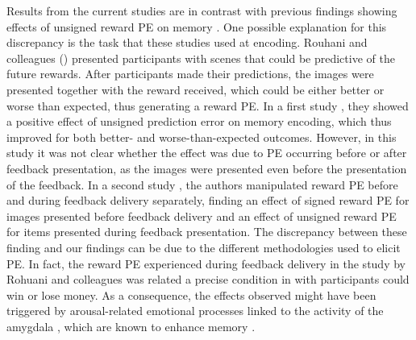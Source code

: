 \documentclass[a4paper,12pt]{article}
\begin{document}
Results from the current studies are in contrast with previous findings showing effects of unsigned reward PE on memory \citep{Rouhani2018, Rouhani2021}. One possible explanation for this discrepancy is the task that these studies used at encoding. Rouhani and colleagues (\citeyear{Rouhani2018, Rouhani2021}) presented participants with scenes that could be predictive of the future rewards. After participants made their predictions, the images were presented together with the reward received, which could be either better or worse than expected, thus generating a reward PE. In a first study \citep{Rouhani2018}, they showed a positive effect of unsigned prediction error on memory encoding, which thus improved for both better- and worse-than-expected outcomes. However, in this study it was not clear whether the effect was due to PE occurring before or after feedback presentation, as the images were presented even before the presentation of the feedback. In a second study \citep{Rouhani2021}, the authors manipulated reward PE before and during feedback delivery separately, finding an effect of signed reward PE for images presented before feedback delivery and an effect of unsigned reward PE for items presented during feedback presentation. The discrepancy between these finding and our findings can be due to the different methodologies used to elicit PE. In fact, the reward PE experienced during feedback delivery in the study by Rohuani and colleagues \citep{Rouhani2021} was related a precise condition in with participants could win or lose money. As a consequence, the effects observed might have been triggered by arousal-related emotional processes linked to the activity of the amygdala \citep{watanabe2019reward}, which are known to enhance memory  \citep{mather2011arousal}. 

\end{document}
